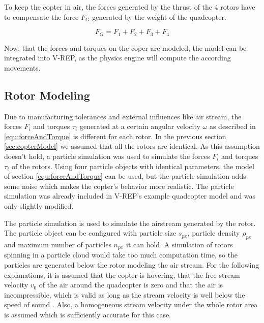     To keep the copter in air, the forces generated by the thrust of the 4 rotors have to compensate the force $F_{G}$ generated by the weight of the quadcopter.
    
    \begin{equation}
    F_G = F_1 + F_2 +F_3 + F_4
    \end{equation}
    
    Now, that the forces and torques on the coper are modeled, the model can be integrated into V-REP, as the physics engine will compute the according movements.
    
    
    \subsection{Rotor Modeling}
    \label{sec:theoryRotor}
    
    Due to manufacturing tolerances and external influences like air stream, the forces $F_i$ and torques $\tau_i$ generated at a certain angular velocity $\omega$ as described in \ref{equ:forceAndTorque} is different for each rotor. 
    In the previous section \ref{sec:copterModel} we assumed that all the rotors are identical. 
    As this assumption doesn't hold,  a particle simulation was used to simulate the forces $F_i$ and torques $\tau_i$ of the rotors. 
    Using four particle objects with identical parameters, the model of section \ref{equ:forceAndTorque} can be used, but the particle simulation adds some noise which makes the copter's behavior more realistic. 
    The particle simulation was already included in V-REP's example quadcopter model and was only slightly modified.
    
    The particle simulation is used to simulate the airstream generated by the rotor. 
    The particle object can be configured with  particle size $s_{px}$, particle density $\rho_{px}$ and maximum number of particles $n_{px}$ it can hold. 
    A simulation of rotors spinning in a particle cloud would take too much computation time, so the  particles are generated below the rotor modeling the air stream. 
   For the following explanations, it is assumed that the copter is hovering, that the free stream velocity $v_0$ of the air around the quadcopter is zero and that the air is incompressible, which is valid as long as the stream velocity is well below the speed of sound \cite{Lautrup2011PhysicsContinuous}.
     Also, a homogeneous stream velocity under the whole rotor area is assumed which is sufficiently accurate for this case. 
    
